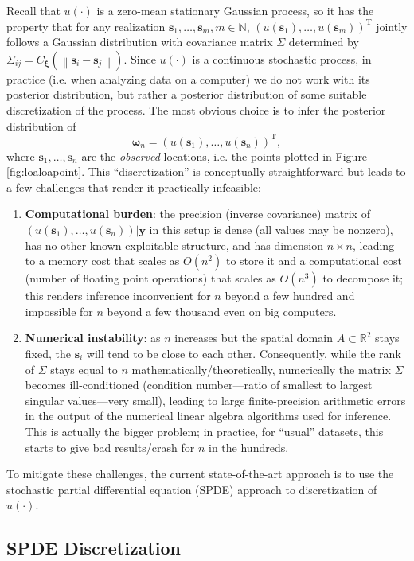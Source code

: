 \documentclass[12pt]{article}
\newcommand{\Nats}{\mathbb{N}}
\newcommand{\Reals}{\mathbb{R}}
\newcommand{\mb}[1]{\boldsymbol{#1}}
\newcommand{\Tr}{^{\textrm{T}}}
\newcommand{\norm}[1]{\left\lVert#1\right\rVert}
\newcommand{\response}{\mb{y}}
\begin{document}
Recall that $u(\cdot)$ is a zero-mean stationary Gaussian process, so it has the property that for any realization $\mb{s}_1,\ldots,\mb{s}_m, m\in\Nats$,
$(u(\mb{s}_1),\ldots,u(\mb{s}_m))\Tr$ jointly follows a Gaussian distribution with covariance matrix $\Sigma$ determined by $\Sigma_{ij} = C_{\mb{\xi}}(\norm{\mb{s}_{i} - \mb{s}_{j}})$.
Since $u(\cdot)$ is a continuous stochastic process, in practice (i.e. when analyzing data on a computer) we do not work with its
posterior distribution, but rather a posterior distribution of some suitable discretization of the process.
The most obvious choice is to infer the posterior distribution of
$$
\mb{\omega}_n = (u(\mb{s}_1),\ldots,u(\mb{s}_n))\Tr,
$$
where $\mb{s}_1,\ldots,\mb{s}_n$ are the \emph{observed} locations, i.e. the points plotted in Figure \ref{fig:loaloapoint}.
This ``discretization'' is conceptually straightforward but leads to a few challenges that render it practically infeasible:
\begin{enumerate}
  \item \textbf{Computational burden}: the precision (inverse covariance) matrix of $(u(\mb{s}_1),\ldots,u(\mb{s}_n))|\response$ in this 
  setup is dense (all values may be nonzero), has no other known exploitable structure, and has dimension $n\times n$, leading to a memory cost that scales as $O(n^2)$ to store it and a computational cost (number of floating point operations) that scales as $O(n^3)$ to decompose it; this renders inference inconvenient for $n$ beyond a few hundred and impossible for $n$ beyond a few thousand even on big computers.
  \item \textbf{Numerical instability}: as $n$ increases but the spatial domain $A\subset\Reals^2$ stays fixed, the $\mb{s}_i$ will tend
  to be close to each other. Consequently, while the rank of $\Sigma$ stays equal to $n$ mathematically/theoretically, numerically the matrix $\Sigma$ becomes ill-conditioned (condition number---ratio of smallest to largest singular values---very small), leading to large finite-precision arithmetic errors in the output of the numerical linear algebra algorithms used for inference. This is actually the bigger problem; in practice, for ``usual'' datasets, this starts to give bad results/crash for $n$ in the hundreds.
\end{enumerate}
To mitigate these challenges, the current state-of-the-art approach is to use the stochastic partial differential equation (SPDE) approach to discretization of $u(\cdot)$.

\subsection{SPDE Discretization}\label{subsec:spde}
\end{document}
